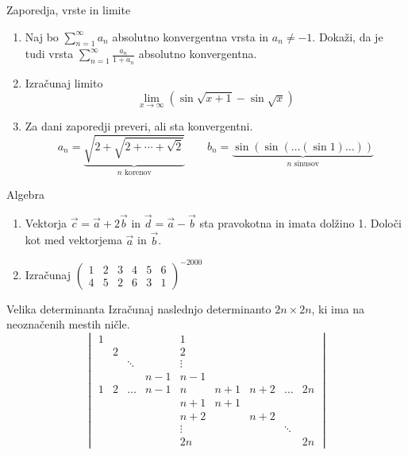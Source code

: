 \begin{frame}{Zaporedja, vrste in limite}
	\begin{enumerate}
		\item 
		Naj bo $ \sum_{n=1}^{\infty} a_{n}$ absolutno konvergentna vrsta in $a_n \ne -1$.
		Dokaži, da je tudi vrsta $\sum_{n=1}^\infty \frac{a_n}{1+a_n}$
		absolutno konvergentna.

		\item
		Izračunaj limito
		$$ \lim_{x \to \infty} (\sin{\sqrt{x+1}}-\sin{\sqrt{x}}) $$

		\item
		Za dani zaporedji preveri, ali sta konvergentni.
		$$
		a_n = \underbrace{\sqrt{2 + \sqrt{2 + \cdots + \sqrt{2}}}}_{n \text{ korenov}} \qquad
		b_n = \underbrace{\sin(\sin(\dots(\sin 1)\dots))}_{n \text{ sinusov}}
		$$

		
	\end{enumerate}
\end{frame}

\begin{frame}{Algebra}
	\begin{enumerate}
		\item
		Vektorja $\vec{c} = \vec{a} + 2\vec{b}$ in $\vec{d} = \vec{a} - \vec{b}$
		sta pravokotna in imata dolžino 1. Določi kot med vektorjema $\vec{a}$ in $\vec{b}$.
		\item 
		Izračunaj
		$
		{
		\begin{pmatrix}
			1 & 2 & 3 & 4 & 5 & 6\\
			4 & 5 & 2 & 6 & 3 & 1
		\end{pmatrix}
		}^{-2000}
		$
	\end{enumerate}
\end{frame}

\begin{frame}{Velika determinanta}
	Izračunaj naslednjo determinanto $2n \times 2n$, ki ima na neoznačenih mestih ničle.
	$$
	\begin{vmatrix}
		1 & & & & 1 & & & & \\
		 & 2 & & & 2 & & & & \\
		 & & \ddots & & \vdots & & & & \\
		 & & & n-1 & n-1 & & & & \\
		1 & 2 & \dots & n-1 & n & n+1 & n+2 & \dots & 2n \\
		& & & & n+1 & n+1 & & & \\
		& & & & n+2 & & n+2 & & \\
		& & & & \vdots & & & \ddots & \\
		& & & & 2n & & & & 2n
	\end{vmatrix}
	$$
\end{frame}

